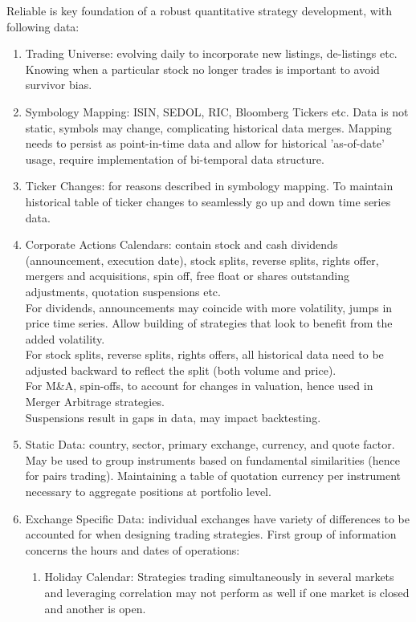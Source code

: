 Reliable  is key foundation of a robust quantitative strategy development, with following data:
\begin{enumerate}[label=\roman*.]
\setlength{\itemsep}{0pt}
\item Trading Universe: evolving daily to incorporate new listings, de-listings etc. Knowing when a particular stock no longer trades is important to avoid survivor bias.
\item Symbology Mapping: ISIN, SEDOL, RIC, Bloomberg Tickers etc. Data is not static, symbols may change, complicating historical data merges. Mapping needs to persist as point-in-time data and allow for historical 'as-of-date' usage, require implementation of bi-temporal data structure. 
\item Ticker Changes: for reasons described in symbology mapping. To maintain historical table of ticker changes to seamlessly go up and down time series data.
\item Corporate Actions Calendars: contain stock and cash dividends (announcement, execution date), stock splits, reverse splits, rights offer, mergers and acquisitions, spin off, free float or shares outstanding adjustments, quotation suspensions etc.\\
For dividends, announcements may coincide with more volatility, jumps in price time series. Allow building of strategies that look to benefit from the added volatility.\\
For stock splits, reverse splits, rights offers, all historical data need to be adjusted backward to reflect the split (both volume and price).\\
For M\&A, spin-offs, to account for changes in valuation, hence used in Merger Arbitrage strategies.\\
Suspensions result in gaps in data, may impact backtesting.
\item Static Data: country, sector, primary exchange, currency, and quote factor. May be used to group instruments based on fundamental similarities (hence for pairs trading). Maintaining a table of quotation currency per instrument necessary to aggregate positions at portfolio level.
\item Exchange Specific Data: individual exchanges have variety of differences to be accounted for when designing trading strategies. First group of information concerns the hours and dates of operations:
\begin{enumerate}[label=\arabic*.]
\setlength{\itemsep}{0pt}
\item Holiday Calendar: Strategies trading simultaneously in several markets and leveraging correlation may not perform as well if one market is closed and another is open.

\end{enumerate}
\end{enumerate}
